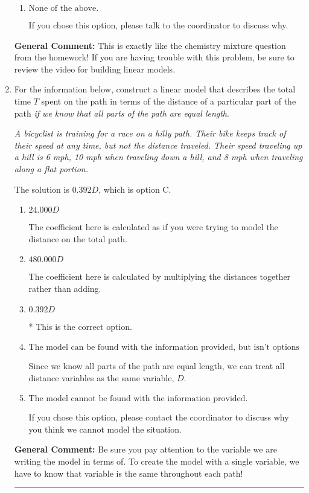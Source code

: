 \documentclass{extbook}[14pt]
\newcommand{\litem}[1]{\item #1

\rule{\textwidth}{0.4pt}}
\begin{document}
\begin{enumerate}
{\begin{enumerate}[label=\Alph*.]
This models the cost of the low-quality bean only, not the blended beans.
\item \( \text{None of the above.} \)

If you chose this option, please talk to the coordinator to discuss why.
\end{enumerate}

\textbf{General Comment:} This is exactly like the chemistry mixture question from the homework! If you are having trouble with this problem, be sure to review the video for building linear models.
}
\litem{
For the information below, construct a linear model that describes the total time $T$ spent on the path in terms of the distance of a particular part of the path \textit{if we know that all parts of the path are equal length}.

\begin{center}
    \textit{ A bicyclist is training for a race on a hilly path. Their bike keeps track of their speed at any time, but not the distance traveled. Their speed traveling up a hill is 6 mph, 10 mph when traveling down a hill, and 8 mph when traveling along a flat portion. }
\end{center}
The solution is \( 0.392 D \), which is option C.\begin{enumerate}[label=\Alph*.]
\item \( 24.000 D \)

The coefficient here is calculated as if you were trying to model the distance on the total path.
\item \( 480.000 D \)

The coefficient here is calculated by multiplying the distances together rather than adding.
\item \( 0.392 D \)

* This is the correct option.
\item \( \text{The model can be found with the information provided, but isn't options 1-3.} \)

Since we know all parts of the path are equal length, we can treat all distance variables as the same variable, $D$.
\item \( \text{The model cannot be found with the information provided.} \)

If you chose this option, please contact the coordinator to discuss why you think we cannot model the situation.
\end{enumerate}

\textbf{General Comment:} Be sure you pay attention to the variable we are writing the model in terms of. To create the model with a single variable, we have to know that variable is the same throughout each path!
}
\end{enumerate}
\end{document}
